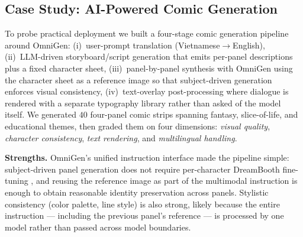\documentclass[conference]{IEEEtran}
\begin{document}
\subsection{Case Study: AI-Powered Comic Generation}
\label{sec:case_study}
To probe practical deployment we built a four-stage comic generation pipeline around OmniGen: (i)~user-prompt translation (Vietnamese$\rightarrow$English), (ii)~LLM-driven storyboard/script generation that emits per-panel descriptions plus a fixed character sheet, (iii)~panel-by-panel synthesis with OmniGen using the character sheet as a reference image so that subject-driven generation enforces visual consistency, (iv)~text-overlay post-processing where dialogue is rendered with a separate typography library rather than asked of the model itself. We generated $40$ four-panel comic strips spanning fantasy, slice-of-life, and educational themes, then graded them on four dimensions: \textit{visual quality}, \textit{character consistency}, \textit{text rendering}, and \textit{multilingual handling}.

\textbf{Strengths.} OmniGen's unified instruction interface made the pipeline simple: subject-driven panel generation does not require per-character DreamBooth fine-tuning \cite{dreambench}, and reusing the reference image as part of the multimodal instruction is enough to obtain reasonable identity preservation across panels. Stylistic consistency (color palette, line style) is also strong, likely because the entire instruction --- including the previous panel's reference --- is processed by one model rather than passed across model boundaries.
\end{document}
